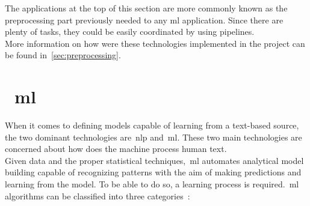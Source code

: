 The applications at the top of this section are more commonly known as the preprocessing part previously needed to any \ac{ml} application. Since there are plenty of tasks, they could be easily coordinated by using pipelines.\\ 
More information on how were these technologies implemented in the project can be found in~\cref{sec:preprocessing}.

\section{~\acl{ml} \cite{tfidf}}
When it comes to defining models capable of learning from a text-based source, the two dominant technologies are~\acl{nlp} and~\acl{ml}. These two main technologies are concerned about how does the machine process human text. \\
Given data and the proper statistical techniques,~\ac{ml} automates analytical model building capable of recognizing patterns with the aim of making predictions and learning from the model. To be able to do so, a learning process is required.~\ac{ml} algorithms can be classified into three categories~\cite{dataclust}:
